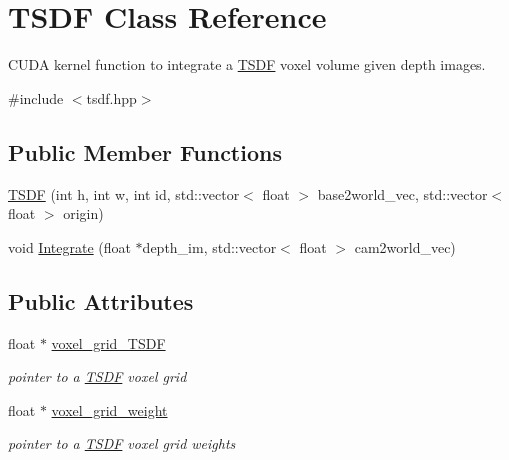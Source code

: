\hypertarget{classTSDF}{}\section{T\+S\+DF Class Reference}
\label{classTSDF}


C\+U\+DA kernel function to integrate a \hyperlink{classTSDF}{T\+S\+DF} voxel volume given depth images.  




{\ttfamily \#include $<$tsdf.\+hpp$>$}

\subsection*{Public Member Functions}
\begin{DoxyCompactItemize}
\item 
\hyperlink{classTSDF_ae5f83a336be140ee825d459990e54367}{T\+S\+DF} (int h, int w, int id, std\+::vector$<$ float $>$ base2world\+\_\+vec, std\+::vector$<$ float $>$ origin)
\item 
void \hyperlink{classTSDF_a6ab9e630dd5285603b8a8b0e7633fd88}{Integrate} (float $\ast$depth\+\_\+im, std\+::vector$<$ float $>$ cam2world\+\_\+vec)
\end{DoxyCompactItemize}
\subsection*{Public Attributes}
\begin{DoxyCompactItemize}
\item 
\mbox{\label{classTSDF_a3a2846e89cfa45141d105ade3545f629}} 
float $\ast$ \hyperlink{classTSDF_a3a2846e89cfa45141d105ade3545f629}{voxel\+\_\+grid\+\_\+\+T\+S\+DF}
\begin{DoxyCompactList}\small\item\em pointer to a \hyperlink{classTSDF}{T\+S\+DF} voxel grid \end{DoxyCompactList}\item 
\mbox{\label{classTSDF_aa35557cf4059c58aeed3bc92c181dc5f}} 
float $\ast$ \hyperlink{classTSDF_aa35557cf4059c58aeed3bc92c181dc5f}{voxel\+\_\+grid\+\_\+weight}
\begin{DoxyCompactList}\small\item\em pointer to a \hyperlink{classTSDF}{T\+S\+DF} voxel grid weights \end{DoxyCompactList}\end{DoxyCompactItemize}


